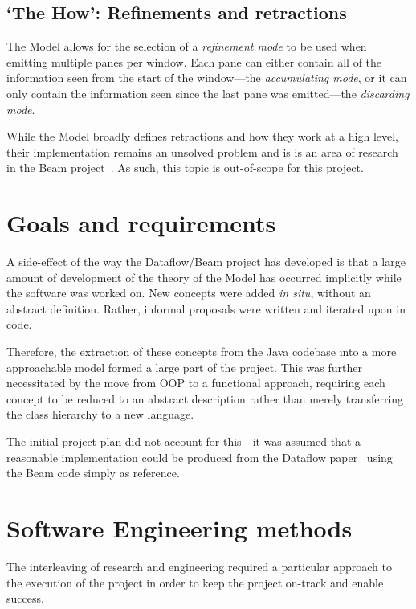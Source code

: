 \subsection{`The How': Refinements and retractions}\label{sec:prep:dataflow:how}

The Model allows for the selection of a \emph{refinement mode} to be used when emitting multiple panes per window.
Each pane can either contain all of the information seen from the start of the window---the \emph{accumulating mode}, or it can only contain the information seen since the last pane was emitted---the \emph{discarding mode}.

While the Model broadly defines retractions and how they work at a high level, their implementation remains an unsolved problem and is is an area of research in the Beam project~\cite{JIRA-retractions}.
As such, this topic is out-of-scope for this project.

\section{Goals and requirements}\label{sec:prep:goals}

A side-effect of the way the Dataflow/Beam project has developed is that a large amount of development of the theory of the Model has occurred implicitly while the software was worked on.
New concepts were added \emph{in situ}, without an abstract definition.
Rather, informal proposals were written and iterated upon in code.

Therefore, the extraction of these concepts from the Java codebase into a more approachable model formed a large part of the project.
This was further necessitated by the move from OOP to a functional approach, requiring each concept to be reduced to an abstract description rather than merely transferring the class hierarchy to a new language.

The initial project plan did not account for this---it was assumed that a reasonable implementation could be produced from the Dataflow paper~\cite{Akidau:2015} using the Beam code simply as reference.

\section{Software Engineering methods}\label{sec:prep:softeng}

The interleaving of research and engineering required a particular approach to the execution of the project in order to keep the project on-track and enable success.


